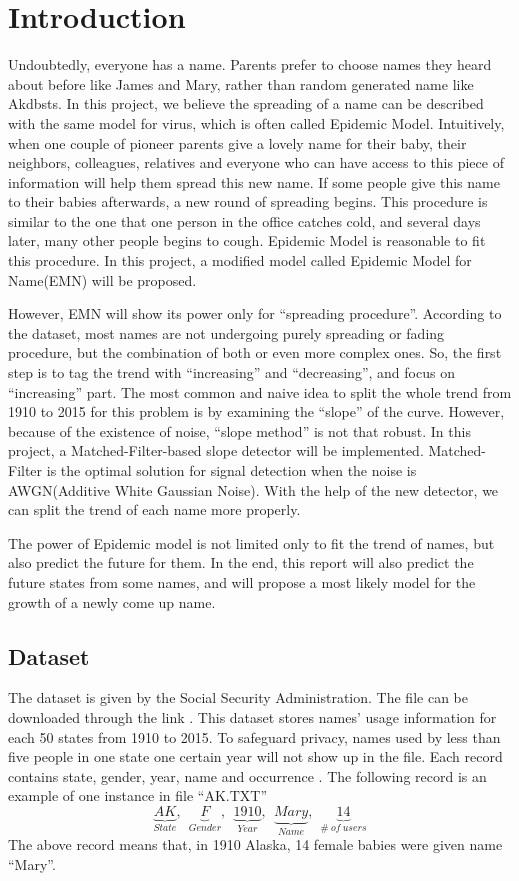 \documentclass[journal]{IEEEtran}
\begin{document}
\section{Introduction} %
\label{sec:introduction}
Undoubtedly, everyone has a name. Parents prefer to choose names they heard about before like James and Mary, rather than random generated name like Akdbsts. In this project, we believe the spreading of a name can be described with the same model for virus, which is often called Epidemic Model\cite{Epidemic_Model_SIR}. Intuitively, when one couple of pioneer parents give a lovely name for their baby, their neighbors, colleagues, relatives and everyone who can have access to this piece of information will help them spread this new name. If some people give this name to their babies afterwards, a new round of spreading begins. This procedure is similar to the one that one person in the office catches cold, and several days later, many other people begins to cough. Epidemic Model is reasonable to fit this procedure. In this project, a modified model called Epidemic Model for Name(EMN) will be proposed.

However, EMN will show its power only for ``spreading procedure''. According to the dataset, most names are not undergoing purely spreading or fading procedure, but the combination of both or even more complex ones. So, the first step is to tag the trend with ``increasing'' and ``decreasing'', and focus on ``increasing'' part. The most common and naive idea to split the whole trend from 1910 to 2015 for this problem is by examining  the ``slope'' of the curve. However, because of the existence of noise, ``slope method'' is not that robust. In this project, a Matched-Filter-based slope detector will be implemented. Matched-Filter\cite{gubner2006probability} is the optimal solution for signal detection when the noise is AWGN(Additive White Gaussian Noise). With the help of the new detector, we can split the trend of each name more properly.

The power of Epidemic model is not limited only to fit the trend of names, but also predict the future for them. In the end, this report will also predict the future states from some names, and will propose a most likely model for the growth of a newly come up name. 
\subsection{Dataset} %
\label{ssub:dataset}
The dataset is given by the Social Security Administration\cite{Social_Security_Administration}. The file can be downloaded through the link \cite{namesbystate}. This dataset stores names' usage information for each 50 states from 1910 to 2015. To safeguard privacy, names used by less than five people in one state one certain year will not show up in the file. 
Each record contains state, gender, year, name and occurrence . The following record is an example of one instance in file ``AK.TXT''
\[
	\underbrace{AK}_{State},~~\underbrace{F}_{Gender},~~\underbrace{1910}_{Year},~~\underbrace{Mary}_{Name},~~\underbrace{14}_{\#~of~users}
\]
The above record means that, in 1910 Alaska, 14 female babies were given name ``Mary''. 
\end{document}
